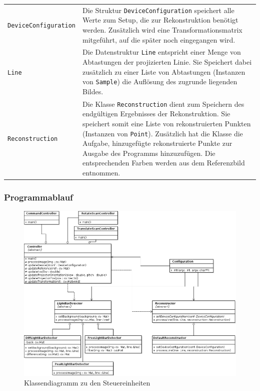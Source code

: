 \documentclass[ngerman,a4paper,parskip=half]{scrartcl}
\begin{document}
\vspace{0.5em}
\begin{tabular}{lp{10cm}}
	\texttt{DeviceConfiguration} &
		Die Struktur \texttt{DeviceConfiguration} speichert alle Werte zum Setup, die zur Rekonstruktion benötigt werden. Zusätzlich wird eine Transformationsmatrix mitgeführt, auf die später noch eingegangen wird.\\[1em]
	\texttt{Line}                &
		Die Datenstruktur \texttt{Line} entspricht einer Menge von Abtastungen der projizierten Linie. Sie Speichert dabei zusätzlich zu einer Liste von Abtastungen (Instanzen von \texttt{Sample}) die Auflösung des zugrunde liegenden Bildes.\\[1em]
	\texttt{Reconstruction}      &
		Die Klasse \texttt{Reconstruction} dient zum Speichern des endgültigen Ergebnisses der Rekonstruktion. Sie speichert somit eine Liste von rekonstruierten Punkten (Instanzen von \texttt{Point}). Zusätzlich hat die Klasse die Aufgabe, hinzugefügte rekonstruierte Punkte zur Ausgabe des Programms hinzuzufügen. Die entsprechenden Farben werden aus dem Referenzbild entnommen.
\end{tabular}

\subsubsection{Programmablauf}

\begin{figure}
	\centering
	\includegraphics[width=\linewidth]{includes/classdiagram_control.png}
	\caption{Klassendiagramm zu den Steuereinheiten}
	\label{fig:classes_control}
\end{figure}
\end{document}
